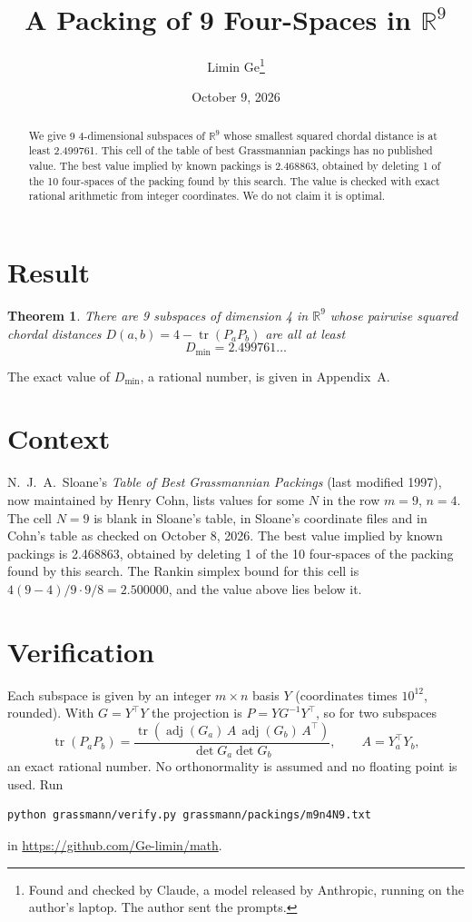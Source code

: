 \documentclass[11pt,a4paper]{article}
\title{A Packing of 9 Four-Spaces in $\mathbb{R}^{9}$}
\author{Limin Ge\thanks{Found and checked by Claude, a model released by Anthropic, running on the author's laptop. The author sent the prompts.}}
\date{October 9, 2026}
\newtheorem*{theorem}{Theorem}
\begin{document}
\maketitle
\begin{abstract}
We give 9 4-dimensional subspaces of $\mathbb{R}^{9}$ whose smallest squared chordal distance is at least 2.499761. This cell of the table of best Grassmannian packings has no published value. The best value implied by known packings is 2.468863, obtained by deleting 1 of the 10 four-spaces of the packing found by this search. The value is checked with exact rational arithmetic from integer coordinates. We do not claim it is optimal.
\end{abstract}

\section{Result}
\begin{theorem}
There are 9 subspaces of dimension 4 in $\mathbb{R}^{9}$ whose pairwise squared chordal distances $D(a,b) = 4 - \operatorname{tr}(P_aP_b)$ are all at least
\[ D_{\min} = 2.499761\ldots \]
\end{theorem}
The exact value of $D_{\min}$, a rational number, is given in Appendix~A.


\section{Context}
N.~J.~A.~Sloane's \emph{Table of Best Grassmannian Packings} (last modified 1997), now maintained by Henry Cohn, lists values for some $N$ in the row $m=9$, $n=4$. The cell $N=9$ is blank in Sloane's table, in Sloane's coordinate files and in Cohn's table as checked on October 8, 2026. The best value implied by known packings is 2.468863, obtained by deleting 1 of the 10 four-spaces of the packing found by this search. The Rankin simplex bound for this cell is $4(9-4)/9\cdot 9/8 = 2.500000$, and the value above lies below it.


\section{Verification}
Each subspace is given by an integer $m\times n$ basis $Y$ (coordinates times $10^{12}$, rounded). With $G=Y^\top Y$ the projection is $P=YG^{-1}Y^\top$, so for two subspaces
\[ \operatorname{tr}(P_aP_b)=\frac{\operatorname{tr}(\operatorname{adj}(G_a)\,A\,\operatorname{adj}(G_b)\,A^\top)}{\det G_a\det G_b},\qquad A=Y_a^\top Y_b, \]
an exact rational number. No orthonormality is assumed and no floating point is used. Run
\begin{verbatim}
python grassmann/verify.py grassmann/packings/m9n4N9.txt
\end{verbatim}
in \url{https://github.com/Ge-limin/math}.
\end{document}
